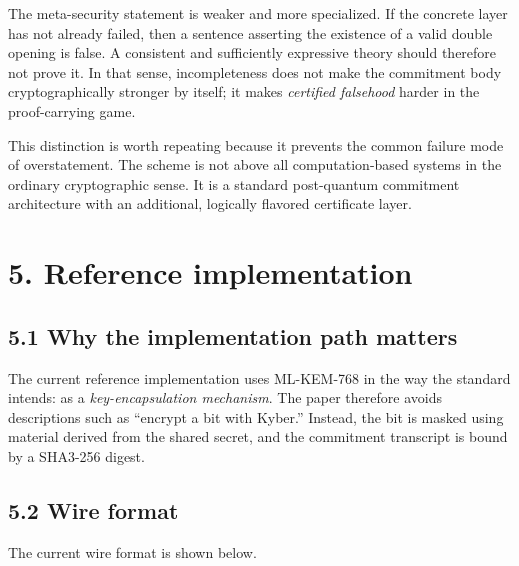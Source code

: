\documentclass[
  11pt,
]{article}
\begin{document}
The meta-security statement is weaker and more specialized. If the
concrete layer has not already failed, then a sentence asserting the
existence of a valid double opening is false. A consistent and
sufficiently expressive theory should therefore not prove it. In that
sense, incompleteness does not make the commitment body
cryptographically stronger by itself; it makes \emph{certified
falsehood} harder in the proof-carrying game.

This distinction is worth repeating because it prevents the common
failure mode of overstatement. The scheme is not above all
computation-based systems in the ordinary cryptographic sense. It is a
standard post-quantum commitment architecture with an additional,
logically flavored certificate layer.

\section{5. Reference implementation}\label{reference-implementation}

\subsection{5.1 Why the implementation path
matters}\label{why-the-implementation-path-matters}

The current reference implementation uses ML-KEM-768 in the way the
standard intends: as a \emph{key-encapsulation mechanism}. The paper
therefore avoids descriptions such as ``encrypt a bit with Kyber.''
Instead, the bit is masked using material derived from the shared
secret, and the commitment transcript is bound by a SHA3-256 digest.

\subsection{5.2 Wire format}\label{wire-format}

The current wire format is shown below.
\end{document}
